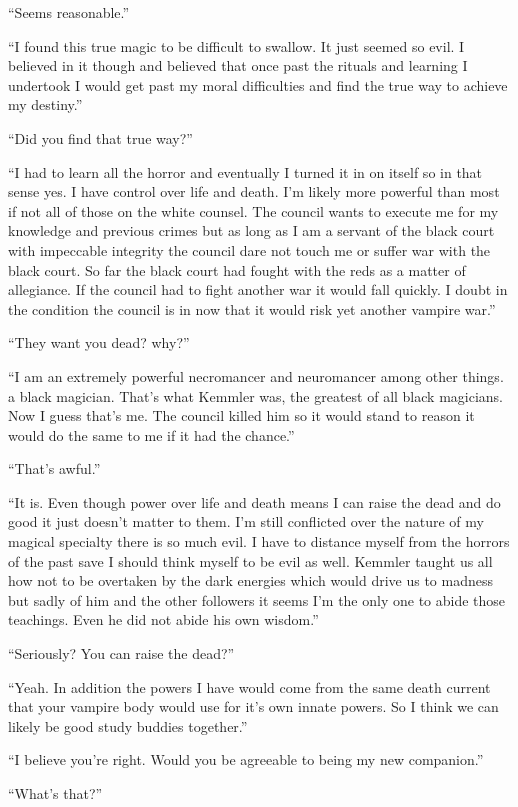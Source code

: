 ``Seems reasonable.''

``I found this true magic to be difficult to swallow. It just seemed so evil. I believed in it though and believed that once past the rituals and learning I undertook I would get past my moral difficulties and find the true way to achieve my destiny.''

``Did you find that true way?''

``I had to learn all the horror and eventually I turned it in on itself so in that sense yes. I have control over life and death. I'm likely more powerful than most if not all of those on the white counsel. The council wants to execute me for my knowledge and previous crimes but as long as I am a servant of the black court with impeccable integrity the council dare not touch me or suffer war with the black court. So far the black court had fought with the reds as a matter of allegiance. If the council had to fight another war it would fall quickly. I doubt in the condition the council is in now that it would risk yet another vampire war.''

``They want you dead? why?''

``I am an extremely powerful necromancer and neuromancer among other things. a black magician. That's what Kemmler was, the greatest of all black magicians. Now I guess that's me. The council killed him so it would stand to reason it would do the same to me if it had the chance.''

``That's awful.''

``It is. Even though power over life and death means I can raise the dead and do good it just doesn't matter to them. I'm still conflicted over the nature of my magical specialty there is so much evil. I have to distance myself from the horrors of the past save I should think myself to be evil as well. Kemmler taught us all how not to be overtaken by the dark energies which would drive us to madness but sadly of him and the other followers it seems I'm the only one to abide those teachings. Even he did not abide his own wisdom.''

``Seriously? You can raise the dead?''

``Yeah. In addition the powers I have would come from the same death current that your vampire body would use for it's own innate powers. So I think we can likely be good study buddies together.''

``I believe you're right. Would you be agreeable to being my new companion.''

``What's that?''

